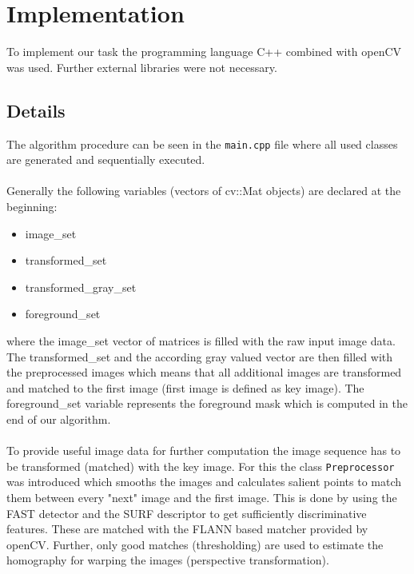 \chapter{Implementation}

To implement our task the programming language C++ combined with openCV was used. Further external libraries were not necessary.

\section{Details}

The algorithm procedure can be seen in the \texttt{main.cpp} file where all used classes are generated and sequentially executed.\\\\

Generally the following variables (vectors of cv::Mat objects) are declared at the beginning:


\begin{itemize}
\item image\_set
\item transformed\_set
\item transformed\_gray\_set
\item foreground\_set
\end{itemize}

where the image\_set vector of matrices is filled with the raw input image data. The transformed\_set and the according gray valued vector are then filled with the preprocessed images which means that all additional images are transformed and matched to the first image (first image is defined as key image). The foreground\_set variable represents the foreground mask which is computed in the end of our algorithm.\\\\

To provide useful image data for further computation the image sequence has to be transformed (matched) with the key image. For this the class \texttt{Preprocessor} was introduced which smooths the images and calculates salient points to match them between every "next" image and the first image. This is done by using the FAST detector and the SURF descriptor to get sufficiently discriminative features. These are matched with the FLANN based matcher provided by openCV. Further, only good matches (thresholding) are used to estimate the homography for warping the images (perspective transformation).\\\\

